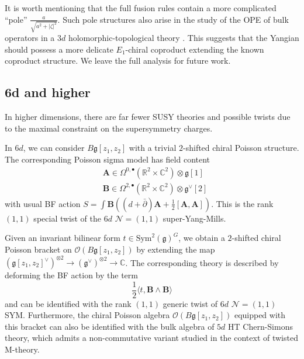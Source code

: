 \documentclass[11pt]{article}
\newcommand{\C}{\mathbb{C}}
\newcommand{\R}{\mathbb{R}}
\numberwithin{equation}{section}
\begin{document}
It is worth mentioning that the full fusion rules contain a more complicated ``pole'' $\frac{a}{\sqrt{a^2+|\zeta|^2}}$. Such pole structures also arise in the study of the OPE of bulk operators in a $3d$ holomorphic-topological theory \cite{costello2023boundary}. This suggests that the Yangian should possess a more delicate $E_1$-chiral coproduct extending the known coproduct structure. We leave the full analysis for future work.


\subsection{6d and higher}
In higher dimensions, there are far fewer SUSY theories and possible twists due to the maximal constraint on the supersymmetry charges. 

In $6d$, we can consider $B\mathfrak{g}[z_1,z_2]$ with a trivial $2$-shifted chiral Poisson structure. The corresponding Poisson sigma model has field content
  \begin{equation}
	\begin{aligned}
		&\boldsymbol{A} \in \Omega^{0,\bullet}(\R^2\times\C^2)\otimes \mathfrak{g}[1]\\
		&\boldsymbol{B} \in \Omega^{2,\bullet}(\R^2\times\C^2)\otimes \mathfrak{g}^{\vee}[2]
	\end{aligned}
\end{equation}
with usual BF action $S = \int \boldsymbol{B}\left( (d+\bar{\partial})\boldsymbol{A} + \frac{1}{2}[\boldsymbol{A},\boldsymbol{A}]\right)$. This is the rank $(1,1)$ special twist of the $6d$ $\mathcal{N} = (1,1)$ super-Yang-Mills.  

Given an invariant bilinear form $t \in \mathrm{Sym}^2(\mathfrak{g})^G$, we obtain a $2$-shifted chiral Poisson bracket on $\mathcal{O}(B\mathfrak{g}[z_1,z_2])$ by extending the map $(\mathfrak{g}[z_1,z_2]^{\vee})^{\otimes 2} \to (\mathfrak{g}^{\vee})^{\otimes 2} \to \C$. The corresponding theory is described by deforming the BF action by the term 
\begin{equation}\label{eq:6d-tdeform}
	\frac{1}{2} \langle t,\boldsymbol{B}\wedge\boldsymbol{B}\rangle
\end{equation}
and can be identified with the rank $(1,1)$ generic twist of $6d$ $\mathcal{N} = (1,1)$ SYM. Furthermore, the chiral Poisson algebra $\mathcal{O}(B\mathfrak{g}[z_1,z_2])$ equipped with this bracket can also be identified with the bulk algebra of $5d$ HT Chern-Simons theory, which admits a non-commutative variant studied in the context of twisted M-theory. 
\end{document}
